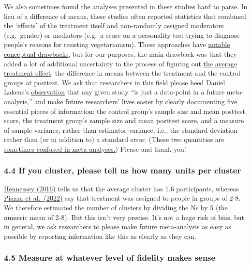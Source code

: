 \documentclass[
  letterpaper,
  DIV=11,
  numbers=noendperiod]{scrartcl}
\begin{document}
We also sometimes found the analyses presented in these studies hard to
parse. In lieu of a difference of means, these studies often reported
statistics that combined the `effects' of the treatment itself and
non-randomly assigned moderators (e.g.~gender) or mediators (e.g.~a
score on a personality test trying to diagnose people's reasons for
resisting vegetarianism). These approaches have
\href{https://journals.sagepub.com/doi/10.1177/0002716209351526}{notable
conceptual drawbacks}, but for our purposes, the main drawback was that
they added a lot of additional uncertainty to the process of figuring
out \href{https://en.wikipedia.org/wiki/Average_treatment_effect}{the
average treatment effect}: the difference in means between the treatment
and the control groups at posttest. We ask that researchers in this
field please heed Daniel Lakens's
\href{https://lakens.github.io/statistical_inferences/11-meta.html}{observation}
that any given study ``is just a data-point in a future meta-analysis,''
and make future researchers' lives easier by clearly documenting five
essential pieces of information: the control group's sample size and
mean posttest score, the treatment group's sample size and mean posttest
score, and a measure of sample variance, rather than estimator variance,
i.e., the standard deviation rather than (or in addition to) a standard
error. (These two quantities are
\href{https://link.springer.com/article/10.1007/s40279-022-01766-0}{sometimes
confused in meta-analyses.}) Please and thank you!

\subsubsection{4.4 If you cluster, please tell us how many units per
cluster}\label{if-you-cluster-please-tell-us-how-many-units-per-cluster}

\href{https://core.ac.uk/download/pdf/158315429.pdf}{Hennessey (2016)}
tells us that the average cluster has 1.6 participants, whereas
\href{https://doi.org/10.1016/j.appet.2021.105726}{Piazza et al.~(2022)}
say that treatment was assigned to people in groups of 2-8. We therefore
estimated the number of clusters by dividing the Ns by 5 (the numeric
mean of 2-8). But this isn't very precise. It's not a huge risk of bias,
but in general, we ask researchers to please make future meta-analysis
as easy as possible by reporting information like this as clearly as
they can.

\subsubsection{4.5 Measure at whatever level of fidelity makes
sense}\label{measure-at-whatever-level-of-fidelity-makes-sense}
\end{document}
